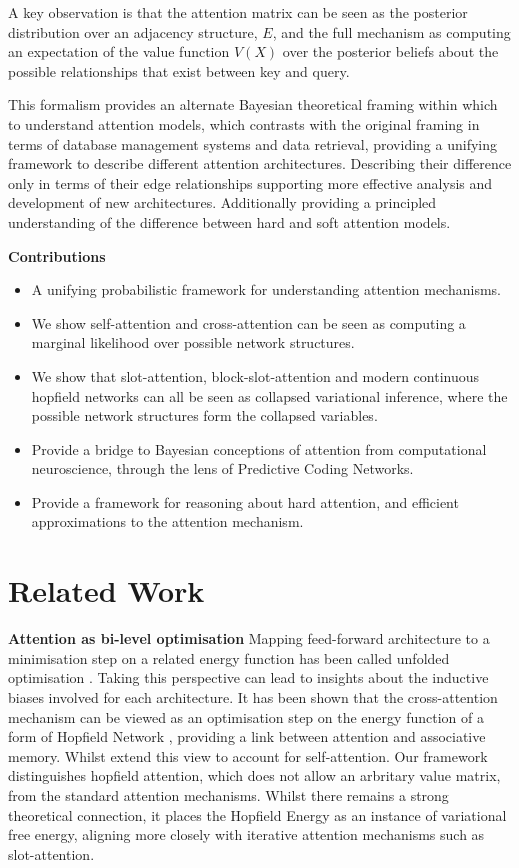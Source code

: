 \documentclass{article}
\theoremstyle{plain}
\theoremstyle{definition}
\theoremstyle{remark}
\begin{document}
A key observation is that the attention matrix can be seen as the posterior distribution over an adjacency structure, $E$, and the full mechanism as computing an expectation of the value function $V(X)$ over the posterior beliefs about the possible relationships that exist between key and query.

This formalism provides an alternate Bayesian theoretical framing within which to understand attention models, which contrasts with the original framing in terms of  database management systems and data retrieval, providing a unifying framework to describe different attention architectures. Describing their difference only in terms of their edge relationships supporting more effective analysis and development of new architectures. Additionally providing  a principled understanding of the difference between hard and soft attention models.


\textbf{Contributions}
\begin{itemize}
    \item A unifying probabilistic framework for understanding attention mechanisms.
    \item We show self-attention and cross-attention can be seen as computing a marginal likelihood over possible network structures.  
    \item We show that slot-attention, block-slot-attention and modern continuous hopfield networks can all be seen as collapsed variational inference, where the possible network structures form the collapsed variables.
    \item Provide a bridge to Bayesian conceptions of attention from computational neuroscience, through the lens of Predictive Coding Networks.
    \item Provide a framework for reasoning about hard attention, and efficient approximations to the attention mechanism.

\end{itemize}


\section{Related Work}
\textbf{Attention as bi-level optimisation}
Mapping feed-forward architecture to a minimisation step on a related energy function has been called unfolded optimisation \cite{frecon_bregman_2022}. Taking this perspective can lead to insights about the inductive biases involved for each architecture. It has been shown that the cross-attention mechanism can be viewed as an optimisation step on the energy function of a form of Hopfield Network \cite{ramsauer_hopfield_2021}, providing a link between attention and associative memory. Whilst \cite{yang_transformers_2022} extend this view to account for self-attention. Our framework distinguishes hopfield attention, which does not allow an arbritary value matrix, from the standard attention mechanisms. Whilst there remains a strong theoretical connection, it  places the Hopfield Energy as an instance of variational free energy, aligning more closely with iterative attention mechanisms such as slot-attention. 
\end{document}
